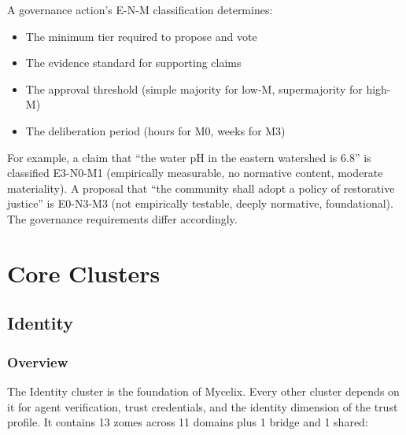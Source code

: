 \documentclass[12pt]{book}
\begin{document}
A governance action's E-N-M classification determines:
\begin{itemize}
  \item The minimum tier required to propose and vote
  \item The evidence standard for supporting claims
  \item The approval threshold (simple majority for low-M, supermajority for high-M)
  \item The deliberation period (hours for M0, weeks for M3)
\end{itemize}

For example, a claim that ``the water pH in the eastern watershed is 6.8'' is
classified E3-N0-M1 (empirically measurable, no normative content, moderate
materiality). A proposal that ``the community shall adopt a policy of
restorative justice'' is E0-N3-M3 (not empirically testable, deeply normative,
foundational). The governance requirements differ accordingly.



\part{Core Clusters}

\chapter{Identity}

\section{Overview}

The Identity cluster is the foundation of Mycelix. Every other cluster depends
on it for agent verification, trust credentials, and the identity dimension of
the trust profile. It contains 13 zomes across 11 domains plus 1 bridge
and 1 shared:
\end{document}
